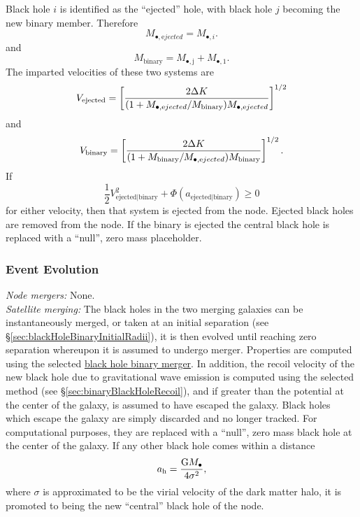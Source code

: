 Black hole $i$ is identified as the ``ejected'' hole, with black hole $j$ becoming the new binary member. Therefore
\begin{equation}
 M_{\bullet, \mathrm ejected} = M_{\bullet, i}.
\end{equation}
and
\begin{equation}
 M_\mathrm{binary} = M_\mathrm{\bullet, j} + M_\mathrm{\bullet, 1}.
\end{equation}
The imparted velocities of these two systems are
\begin{equation}
 V_\mathrm{ejected} = \left[ {2 \Delta K \over (1+M_{\bullet, \mathrm ejected}/M_\mathrm{binary} ) M_{\bullet, \mathrm ejected} }\right]^{1/2}
\end{equation}
and
\begin{equation}
 V_\mathrm{binary} = \left[ {2 \Delta K \over (1+M_\mathrm{binary} /M_{\bullet, \mathrm ejected}) M_\mathrm{binary}}\right]^{1/2}.
\end{equation}
If
\begin{equation}
 \frac{1}{2} V_\mathrm{ejected|binary}^2 + \Phi(a_\mathrm{ejected|binary}) \ge 0
\end{equation}
for either velocity, then that system is ejected from the node. Ejected black holes are removed from the node. If the binary is ejected the central black hole is replaced with a ``null'', zero mass placeholder.

\subsubsection{Event Evolution}

\noindent\emph{Node mergers:} None.\\

\noindent\emph{Satellite merging:} The black holes in the two merging galaxies can be instantaneously merged, or taken at an initial separation (see \S\ref{sec:blackHoleBinaryInitialRadii}), it is then evolved until reaching zero separation whereupon it is assumed to undergo merger. Properties are computed using the selected \href{https://github.com/galacticusorg/galacticus/releases/download/masterRelease/Galacticus_Development.pdf\#methods.blackHoleBinaryMerger}{black hole binary merger}. In addition, the recoil velocity of the new black hole due to gravitational wave emission is computed using the selected method (see \S\ref{sec:binaryBlackHoleRecoil}), and if greater than the potential at the center of the galaxy, is assumed to have escaped the galaxy. Black holes which escape the galaxy are simply discarded and no longer tracked. For computational purposes, they are replaced with a ``null'', zero mass black hole at the center of the galaxy. If any other black hole comes within a distance 
\begin{equation}
a_\mathrm{h} = {\mathrm{G} M_\bullet \over 4 \sigma^2},
\end{equation}
where $\sigma$ is approximated to be the virial velocity of the dark matter halo, it is promoted to being the new ``central'' black hole of the node.\\

